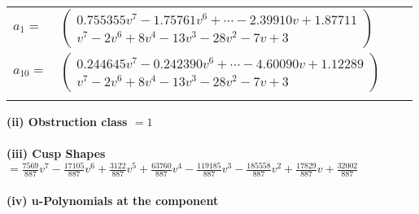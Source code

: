 \documentclass[1p]{elsarticle_modified}
\theoremstyle{definition}
\begin{document}
\begin{tabular}{m{7pt} m{180pt} m{7pt} m{180pt} }
\flushright $a_{1}=$&$\begin{pmatrix}0.755355 v^{7}-1.75761 v^{6}+\cdots-2.39910 v+1.87711\\v^7-2 v^6+8 v^4-13 v^3-28 v^2-7 v+3\end{pmatrix}$ \\
\flushright $a_{10}=$&$\begin{pmatrix}0.244645 v^{7}-0.242390 v^{6}+\cdots-4.60090 v+1.12289\\v^7-2 v^6+8 v^4-13 v^3-28 v^2-7 v+3\end{pmatrix}$\\&\end{tabular}
\flushleft \textbf{(ii) Obstruction class $= 1$}\\~\\
\flushleft \textbf{(iii) Cusp Shapes $= \frac{7569}{887} v^7-\frac{17105}{887} v^6+\frac{3122}{887} v^5+\frac{63760}{887} v^4-\frac{119185}{887} v^3-\frac{185558}{887} v^2+\frac{17829}{887} v+\frac{32002}{887}$}\\~\\
\newpage\renewcommand{\arraystretch}{1}
\flushleft \textbf{(iv) u-Polynomials at the component}\newline \\
\end{document}
